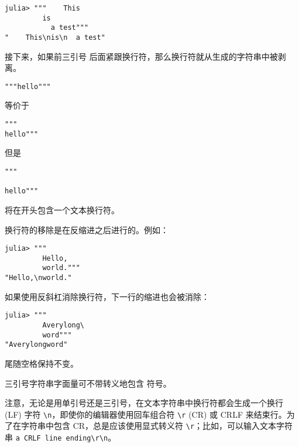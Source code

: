 \begin{verbatim}
julia> """    This
         is
           a test"""
"    This\nis\n  a test"
\end{verbatim}



接下来，如果前三引号 \texttt{{\textquotedbl}{\textquotedbl}{\textquotedbl}} 后面紧跟换行符，那么换行符就从生成的字符串中被剥离。




\begin{verbatim}
"""hello"""
\end{verbatim}



等价于




\begin{verbatim}
"""
hello"""
\end{verbatim}



但是




\begin{verbatim}
"""

hello"""
\end{verbatim}



将在开头包含一个文本换行符。



换行符的移除是在反缩进之后进行的。例如：




\begin{verbatim}
julia> """
         Hello,
         world."""
"Hello,\nworld."
\end{verbatim}



如果使用反斜杠消除换行符，下一行的缩进也会被消除：




\begin{verbatim}
julia> """
         Averylong\
         word"""
"Averylongword"
\end{verbatim}



尾随空格保持不变。



三引号字符串字面量可不带转义地包含 \texttt{{\textquotedbl}} 符号。



注意，无论是用单引号还是三引号，在文本字符串中换行符都会生成一个换行 (LF) 字符 \texttt{{\textbackslash}n}，即使你的编辑器使用回车组合符 \texttt{{\textbackslash}r} (CR) 或 CRLF 来结束行。为了在字符串中包含 CR，总是应该使用显式转义符 \texttt{{\textbackslash}r}；比如，可以输入文本字符串 \texttt{{\textquotedbl}a CRLF line ending{\textbackslash}r{\textbackslash}n{\textquotedbl}}。



